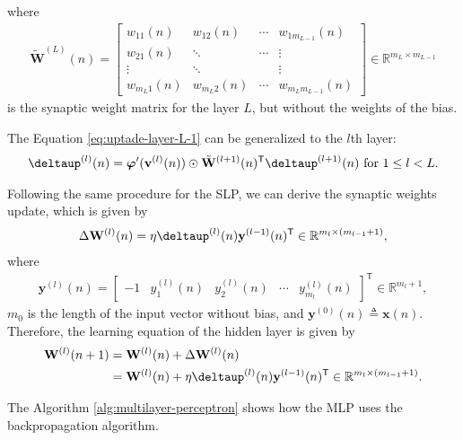 \documentclass[12pt,a4paper]{article}
\newcommand{\trans}{\mathsf{T}}
\newcommand{\Real}{\mathbb{R}}
\begin{document}
where
\begin{align}
    \tilde{\mathbf{W}}^{(L)}(n) = \begin{bmatrix}
        w_{11} (n) & w_{12} (n) & \cdots & w_{1 m_{L-1}} (n) \\
        w_{21} (n) & \ddots & \cdots & \vdots \\
        \vdots & \ddots & & \vdots \\
        w_{m_L1} (n) & w_{m_L2} (n) & \cdots & w_{m_Lm_{L-1}} (n)
    \end{bmatrix} \in \Real^{m_L \times m_{L-1}}
\end{align}
is the synaptic weight matrix for the layer \(L\), but without the weights of the bias.

The Equation \eqref{eq:uptade-layer-L-1} can be generalized to the \(l\)th layer:
\begin{align}
    \boldsymbol{\deltaup}^{(l)} (n) = \boldsymbol{\varphi}'(\mathbf{v}^{(l)}(n)) \odot \tilde{\mathbf{W}}^{(l+1)}(n)^\trans \boldsymbol{\deltaup}^{(l+1)} (n)\text{ for } 1\leq l < L.
    \label{eq:uptade-layer-l}
\end{align}

Following the same procedure for the SLP, we can derive the synaptic weights update, which is given by
\begin{align}
    \Delta \mathbf{W}^{(l)}(n) = \eta\boldsymbol{\deltaup}^{(l)}(n) \mathbf{y}^{(l-1)}(n)^\trans \in \Real^{m_l \times (m_{l-1}+1)},
\end{align}
where
\begin{align}
    \mathbf{y}^{(l)}(n) = \begin{bmatrix}
        -1 & y_1^{(l)}(n) & y_2^{(l)}(n) & \cdots & y_{m_{l}}^{(l)}(n)
    \end{bmatrix}^\trans \in \Real^{m_{l}+1},
\end{align}
\(m_0\) is the length of the input vector without bias, and \(\mathbf{y}^{(0)}(n) \triangleq \mathbf{x}(n)\). Therefore, the learning equation of the hidden layer is given by
\begin{align}
    \mathbf{W}^{(l)}(n+1) & = \mathbf{W}^{(l)}(n) + \Delta \mathbf{W}^{(l)}(n) \nonumber \\
    & = \mathbf{W}^{(l)}(n) + \eta\boldsymbol{\deltaup}^{(l)}(n) \mathbf{y}^{(l-1)}(n)^\trans \in \Real^{m_l \times (m_{l-1}+1)}.
\end{align}


The Algorithm \ref{alg:multilayer-perceptron} shows how the MLP uses the backpropagation algorithm.
\end{document}
